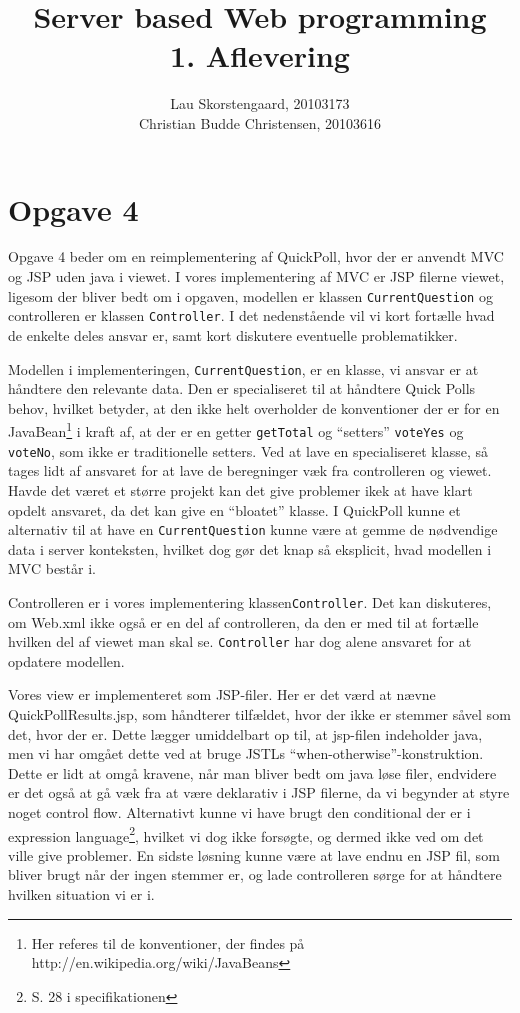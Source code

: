 \documentclass[a4paper,10pt]{article}
\author{Lau Skorstengaard, 20103173 \\Christian Budde Christensen, 20103616}
\title{Server based Web programming\\1. Aflevering}
\begin{document}
\maketitle

\section*{Opgave 4}
Opgave 4 beder om en reimplementering af QuickPoll, hvor der er anvendt MVC og JSP uden java i viewet. I vores implementering af MVC er JSP filerne viewet, ligesom der bliver bedt om i opgaven, modellen er klassen \texttt{CurrentQuestion} og controlleren er klassen \texttt{Controller}. I det nedenstående vil vi kort fortælle hvad de enkelte deles ansvar er, samt kort diskutere eventuelle problematikker.

Modellen i implementeringen, \texttt{CurrentQuestion}, er en klasse, vi ansvar er at håndtere den relevante data. Den er specialiseret til at håndtere Quick Polls behov, hvilket betyder, at den ikke helt overholder de konventioner der er for en JavaBean\footnote{Her referes til de konventioner, der findes på http://en.wikipedia.org/wiki/JavaBeans} i kraft af, at der er en getter \texttt{getTotal} og ``setters'' \texttt{voteYes} og \texttt{voteNo}, som ikke er traditionelle setters. Ved at lave en specialiseret klasse, så tages lidt af ansvaret for at lave de beregninger væk fra controlleren og viewet. Havde det været et større projekt kan det give problemer ikek at have klart opdelt ansvaret, da det kan give en ``bloatet'' klasse. I QuickPoll kunne et alternativ til at have en \texttt{CurrentQuestion} kunne være at gemme de nødvendige data i server konteksten, hvilket dog gør det knap så eksplicit, hvad modellen i MVC består i.

Controlleren er i vores implementering  klassen\texttt{Controller}. Det kan diskuteres, om Web.xml ikke også er en del af controlleren, da den er med til at fortælle hvilken del af viewet man skal se. \texttt{Controller} har dog alene ansvaret for at opdatere modellen.

Vores view er implementeret som JSP-filer. Her er det værd at nævne QuickPollResults.jsp, som håndterer tilfældet, hvor der ikke er stemmer såvel som det, hvor der er. Dette lægger umiddelbart op til, at jsp-filen indeholder java, men vi har omgået dette ved at bruge JSTLs ``when-otherwise''-konstruktion. Dette er lidt at omgå kravene, når man bliver bedt om java løse filer, endvidere er det også at gå væk fra at være deklarativ i JSP filerne, da vi begynder at styre noget control flow. Alternativt kunne vi have brugt den conditional der er i expression language\footnote{S. 28 i specifikationen}, hvilket vi dog ikke forsøgte, og dermed ikke ved om det ville give problemer. En sidste løsning kunne være at lave endnu en JSP fil, som bliver brugt når der ingen stemmer er, og lade controlleren sørge for at håndtere hvilken situation vi er i.


\end{document}

